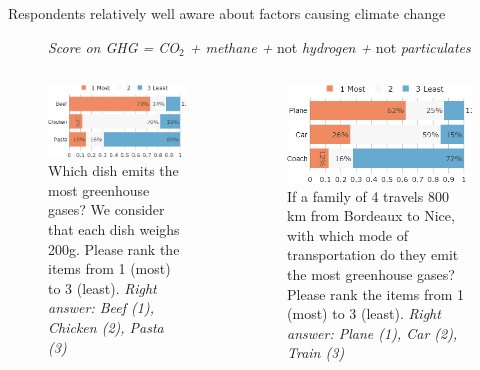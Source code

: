 \begin{framefont}{\small}
\begin{frame}{Respondents relatively well aware about factors causing climate change}
\begin{figure}[h!]
	\textit{Score on GHG = CO$_\text{2}$ + methane + }not\textit{ hydrogen + }not\textit{ particulates}
	\end{figure}
\end{frame}
	
	
\begin{frame}{}%
	\begin{columns}
	\begin{column}{0.5\textwidth}
	\begin{figure}
	\caption{Which dish emits the most greenhouse gases? We consider that each dish weighs 200g.
	Please rank the items from 1 (most) to 3 (least).
	\newline \footnotesize{\textit{Right answer: Beef (1), Chicken (2), Pasta (3)}}}
	\includegraphics[width=.43\paperwidth]{../figures/FR/footprint_food_FR.png}
	\end{figure}
	\end{column}
	\begin{column}{0.5\textwidth}
	\begin{figure}
	\caption{If a family of 4 travels 800 km from Bordeaux to Nice, with which mode of transportation do they emit the most greenhouse gases? 
	Please rank the items from 1 (most) to 3 (least).
	\newline \footnotesize{\textit{Right answer: Plane (1), Car (2), Train (3)}}} %
	\includegraphics[width=.43\paperwidth]{../figures/FR/footprint_transport_FR.png}
	\end{figure}
	\end{column}
	\end{columns}
\end{frame}
	

\end{framefont}
